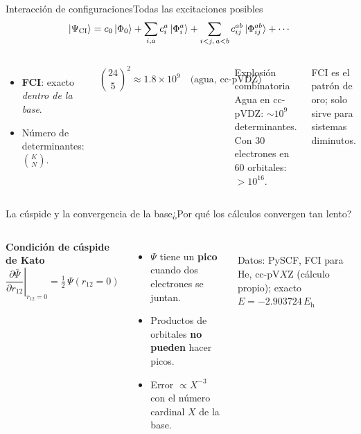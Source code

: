 \documentclass[aspectratio=169]{beamer}
\newcommand{\cplx}[1]{{\footnotesize\color{cookieMuted}#1}}
\newcommand{\src}[1]{{\tiny\color{cookieMuted}#1}}
\newcommand{\Eh}{E_\mathrm{h}}
\begin{document}
\begin{frame}{Interacción de configuraciones}{Todas las excitaciones posibles}
  \[ \ket{\Psi_\mathrm{CI}}=c_0\ket{\Phi_0}+\sum_{i,a}c_i^a\ket{\Phi_i^a}+\sum_{i<j,\,a<b}c_{ij}^{ab}\ket{\Phi_{ij}^{ab}}+\cdots \]
  \begin{columns}[T,onlytextwidth]
      \begin{itemize}\setlength\itemsep{4pt}
        \item \textbf{FCI}: exacto \emph{dentro de la base}.
        \item Número de determinantes: $\binom{K}{N}$.
      \end{itemize}
      \[ \binom{24}{5}^{2}\approx 1.8\times10^{9}\quad\text{(agua, cc-pVDZ)} \]
      \begin{alertblock}{Explosión combinatoria}
        Agua en cc-pVDZ: $\sim\!10^{9}$ determinantes. Con 30 electrones en 60 orbitales: $>\!10^{16}$.
      \end{alertblock}
      \cplx{FCI es el patrón de oro; solo sirve para sistemas diminutos.}
  \end{columns}
\end{frame}

\begin{frame}{La cúspide y la convergencia de la base}{¿Por qué los cálculos convergen tan lento?}
  \begin{columns}[T,onlytextwidth]
      \textbf{Condición de cúspide de Kato}
      \[ \left.\frac{\partial\bar\Psi}{\partial r_{12}}\right|_{r_{12}=0}=\tfrac12\,\Psi(r_{12}=0) \]
      \begin{itemize}\setlength\itemsep{3pt}
        \item $\Psi$ tiene un \textbf{pico} cuando dos electrones se juntan.
        \item Productos de orbitales \textbf{no pueden} hacer picos.
        \item Error $\propto X^{-3}$ con el número cardinal $X$ de la base.
      \end{itemize}
      \\
      \src{Datos: PySCF, FCI para He, cc-pV$X$Z (cálculo propio); exacto $E=-2.903724\,\Eh$}
  \end{columns}
\end{frame}
\end{document}
